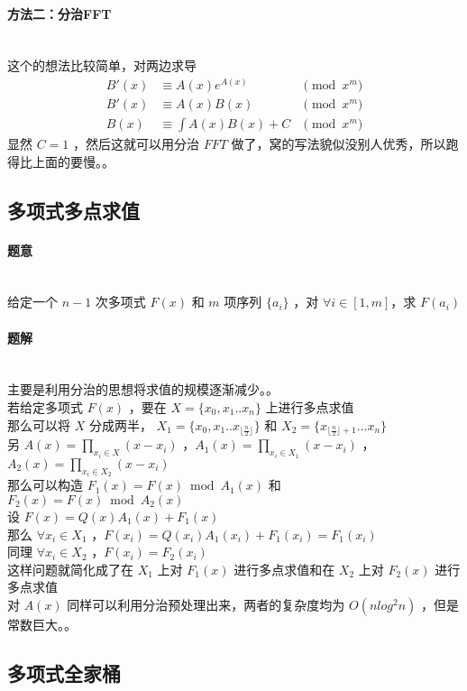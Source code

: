 	\paragraph{方法二：分治FFT}~\\
	这个的想法比较简单，对两边求导
	$$
	\begin{aligned}
	B'(x)&\equiv A(x)e^{A(x)} &\pmod{x^m}\\
	B'(x)&\equiv A(x)B(x)&\pmod{x^m}\\
	B(x)&\equiv \int A(x)B(x)+C&\pmod{x^m}
	\end{aligned}
	$$
	显然 $C=1$ ，然后这就可以用分治 $FFT$ 做了，窝的写法貌似没别人优秀，所以跑得比上面的要慢。。\\
	\vspace{1cm}
	\subsection{多项式多点求值}
	\paragraph{题意}~\\
	给定一个 $n-1$ 次多项式 $F(x)$ 和 $m$ 项序列 $\{a_i\}$ ，对 $\forall i\in[1,m]$，求 $F(a_i)$
	\paragraph{题解}~\\
	主要是利用分治的思想将求值的规模逐渐减少。。\\
	若给定多项式 $F(x)$ ，要在 $X=\{x_0,x_1..x_n\}$ 上进行多点求值\\
	那么可以将 $X$ 分成两半， $X_1=\{x_0,x_1..x_{\lfloor\frac{n}{2} \rfloor} \}$ 和 $X_2=\{x_{\lfloor\frac{n}{2} \rfloor+1}...x_n\}$\\
	另 $A(x)=\prod_{x_i\in X} (x-x_i)$ ，$A_1(x)=\prod_{x_i\in X_1} (x-x_i)$ ，$A_2(x)=\prod_{x_i\in X_2} (x-x_i)$\\
	那么可以构造 $F_1(x)=F(x)\bmod{A_1(x)}$ 和 $F_2(x)=F(x)\bmod{A_2(x)}$\\
	设 $F(x)=Q(x)A_1(x)+F_1(x)$\\
	那么 $\forall x_i\in X_1$ ，$F(x_i)=Q(x_i)A_1(x_i)+F_1(x_i)=F_1(x_i)$\\
	同理 $\forall x_i\in X_2$ ，$F(x_i)=F_2(x_i)$\\
	这样问题就简化成了在 $X_1$ 上对 $F_1(x)$ 进行多点求值和在 $X_2$ 上对 $F_2(x)$ 进行多点求值\\
	对 $A(x)$ 同样可以利用分治预处理出来，两者的复杂度均为 $O(nlog^2n)$ ，但是常数巨大。。\\
	\newpage
	\subsection{多项式全家桶}
	
%	
